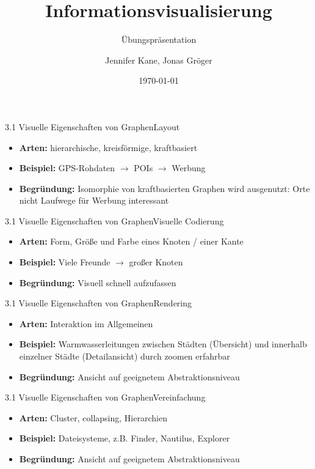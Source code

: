 \documentclass[%
11pt,a4paper,xcolor={usenames,dvipsnames}]{beamer}
\author{Jennifer Kane, Jonas Gröger}
\date{\today}
\begin{document}
    \begin{frame}[plain]
    \title{Informationsvisualisierung}
	\subtitle{Übungspräsentation}
	\titlepage
    \end{frame}

    \begin{frame}{3.1 Visuelle Eigenschaften von Graphen}{Layout}
        \begin{itemize}
            \item \textbf{Arten:} hierarchische, kreisförmige, kraftbasiert
            \item \textbf{Beispiel:} GPS-Rohdaten $\rightarrow$ POIs $\rightarrow$ Werbung
            \item \textbf{Begründung:} Isomorphie von kraftbasierten Graphen wird ausgenutzt: Orte nicht Laufwege für Werbung interessant
        \end{itemize}
    \end{frame}

    \begin{frame}{3.1 Visuelle Eigenschaften von Graphen}{Visuelle Codierung}
        \begin{itemize}
            \item \textbf{Arten:} Form, Größe und Farbe eines Knoten / einer Kante
            \item \textbf{Beispiel:} Viele Freunde $\rightarrow$ großer Knoten
            \item \textbf{Begründung:} Visuell schnell aufzufassen
        \end{itemize}
    \end{frame}

    \begin{frame}{3.1 Visuelle Eigenschaften von Graphen}{Rendering}
        \begin{itemize}
            \item \textbf{Arten:} Interaktion im Allgemeinen
            \item \textbf{Beispiel:} Warmwasserleitungen zwischen Städten (Übersicht) und innerhalb einzelner Städte (Detailansicht) durch zoomen erfahrbar
            \item \textbf{Begründung:} Ansicht auf geeignetem Abstraktionsniveau
        \end{itemize}
    \end{frame}

    \begin{frame}{3.1 Visuelle Eigenschaften von Graphen}{Vereinfachung}
        \begin{itemize}
            \item \textbf{Arten:} Cluster, collapsing, Hierarchien
            \item \textbf{Beispiel:} Dateisysteme, z.B. Finder, Nautilus, Explorer
            \item \textbf{Begründung:} Ansicht auf geeignetem Abstraktionsniveau
        \end{itemize}
    \end{frame}
\end{document}
